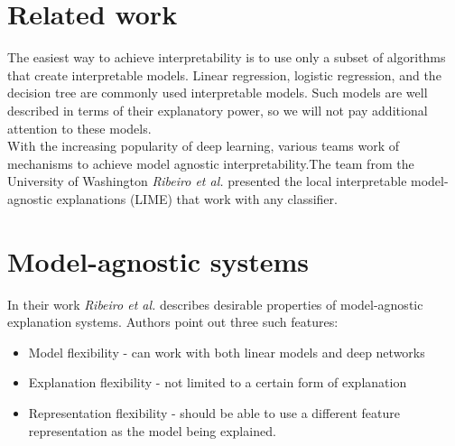 \section{Related work}
The easiest way to achieve interpretability is to use only a subset of algorithms that create interpretable models. Linear regression, logistic regression, and the decision tree are commonly used interpretable models.\cite{molnar2019}
Such models are well described in terms of their explanatory power, so we will not pay additional attention to these models. \\
With the increasing popularity of deep learning, various teams work of mechanisms to achieve model agnostic interpretability\cite{ribeiro2016model}.The team from the University of Washington \textit{Ribeiro et al.}\cite{RibeiroSG16}  presented the local interpretable model-agnostic explanations (LIME) that work with any classifier. 


\section{Model-agnostic systems}
In their work \textit{Ribeiro et al.}\cite{ribeiro2016model} describes desirable properties of model-agnostic explanation systems. Authors point out three such features:
\begin{itemize}
    \item Model flexibility -  can work with both linear models and deep networks
    \item Explanation flexibility - not limited to a certain form of explanation
    \item Representation flexibility - should be able to use a different feature representation as the model being explained. 
\end{itemize}

\newpage
\printbibliography
